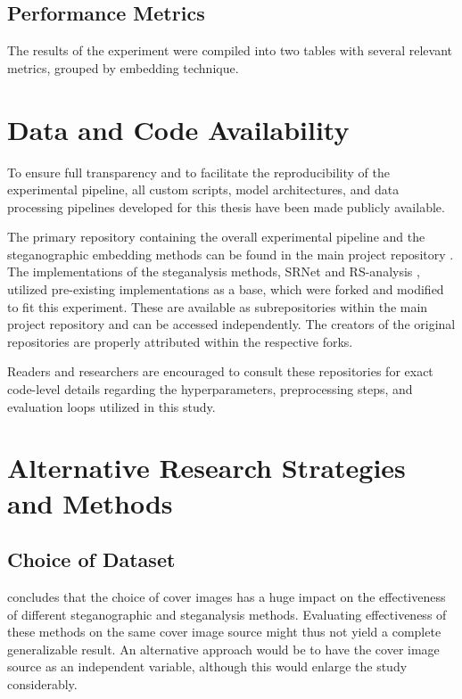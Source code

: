 \subsection{Performance Metrics}

The results of the experiment were compiled into two tables with several relevant metrics, grouped by embedding technique.


\section{Data and Code Availability}
To ensure full transparency and to facilitate the reproducibility of the experimental pipeline, all custom scripts, model architectures, 
and data processing pipelines developed for this thesis have been made publicly available. 

The primary repository containing the overall experimental pipeline and the steganographic embedding methods can be 
found in the main project repository \cite{GullbrandssonPakos2026project}. 
The implementations of the steganalysis methods, SRNet \cite{GullbrandssonPakos2026srnet} and RS-analysis \cite{GullbrandssonPakos2026rs}, utilized pre-existing implementations as a base, which were forked and modified to fit this 
experiment. These are available as subrepositories within the main project repository and can be accessed independently. The creators of the original repositories are properly attributed within the respective forks.

Readers and researchers are encouraged to consult these repositories for exact code-level details regarding the hyperparameters, 
preprocessing steps, and evaluation loops utilized in this study.


\section{Alternative Research Strategies and Methods}
\subsection{Choice of Dataset}
\textcite{Sedighi2016} concludes that the choice of cover images has a huge impact on the effectiveness of different steganographic and steganalysis methods. 
Evaluating effectiveness of these methods on the same cover image source might thus not yield a complete generalizable result. An alternative approach would be to have the cover image source as an independent variable, although this would enlarge the study considerably. 

